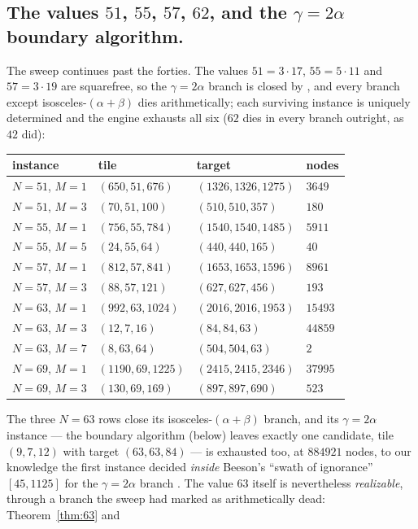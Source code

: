 \documentclass[11pt,reqno]{amsart}
\theoremstyle{plain}
\theoremstyle{definition}
\begin{document}
\subsection*{The values $51$, $55$, $57$, $62$, and the $\gamma=2\alpha$ boundary algorithm.}
The sweep continues past the forties. The values $51=3\cdot17$, $55=5\cdot11$ and $57=3\cdot19$
are squarefree, so the $\gamma=2\alpha$ branch is closed by \cite[Thm.~11.7]{BeesonIso}, and every
branch except isosceles-$(\alpha{+}\beta)$ dies arithmetically; each surviving instance is uniquely
determined and the engine exhausts all six ($62$ dies in every branch outright, as $42$ did):
\begin{center}
\begin{tabular}{llll}
instance & tile & target & nodes\\
\hline
$N{=}51$, $M{=}1$ & $(650,51,676)$ & $(1326,1326,1275)$ & $3649$\\
$N{=}51$, $M{=}3$ & $(70,51,100)$ & $(510,510,357)$ & $180$\\
$N{=}55$, $M{=}1$ & $(756,55,784)$ & $(1540,1540,1485)$ & $5911$\\
$N{=}55$, $M{=}5$ & $(24,55,64)$ & $(440,440,165)$ & $40$\\
$N{=}57$, $M{=}1$ & $(812,57,841)$ & $(1653,1653,1596)$ & $8961$\\
$N{=}57$, $M{=}3$ & $(88,57,121)$ & $(627,627,456)$ & $193$\\
$N{=}63$, $M{=}1$ & $(992,63,1024)$ & $(2016,2016,1953)$ & $15493$\\
$N{=}63$, $M{=}3$ & $(12,7,16)$ & $(84,84,63)$ & $44859$\\
$N{=}63$, $M{=}7$ & $(8,63,64)$ & $(504,504,63)$ & $2$\\
$N{=}69$, $M{=}1$ & $(1190,69,1225)$ & $(2415,2415,2346)$ & $37995$\\
$N{=}69$, $M{=}3$ & $(130,69,169)$ & $(897,897,690)$ & $523$\\
\end{tabular}
\end{center}
The three $N{=}63$ rows close its isosceles-$(\alpha{+}\beta)$ branch, and its $\gamma=2\alpha$
instance --- the boundary algorithm (below) leaves exactly one candidate, tile $(9,7,12)$ with
target $(63,63,84)$ --- is exhausted too, at $884921$ nodes, to our knowledge the first instance
decided \emph{inside} Beeson's ``swath of ignorance'' $[45,1125]$ for the $\gamma=2\alpha$ branch
\cite[\S11.6]{BeesonIso}. The value $63$ itself is nevertheless \emph{realizable}, through a
branch the sweep had marked as arithmetically dead: Theorem~\ref{thm:63} and
\end{document}
